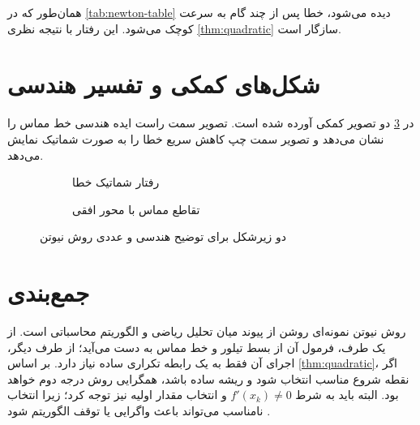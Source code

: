 همان‌طور که در \cref{tab:newton-table} دیده می‌شود، خطا پس از چند گام به سرعت کوچک می‌شود. این رفتار با نتیجه نظری \cref{thm:quadratic} سازگار است.

\section{شکل‌های کمکی و تفسیر هندسی}
در \cref{fig:subfigures} دو تصویر کمکی آورده شده است. تصویر سمت راست ایده هندسی خط مماس را نشان می‌دهد و تصویر سمت چپ کاهش سریع خطا را به صورت شماتیک نمایش می‌دهد.

\begin{figure}[H]
\centering
\begin{subfigure}{0.46\textwidth}
\centering
{}
\caption{رفتار شماتیک خطا}
\label{fig:error-sub}
\end{subfigure}
\hfill
\begin{subfigure}{0.46\textwidth}
\centering
{}
\caption{تقاطع مماس با محور افقی}
\label{fig:tangent-sub}
\end{subfigure}
\caption{دو زیرشکل برای توضیح هندسی و عددی روش نیوتن}
\label{fig:subfigures}
\end{figure}

\section{جمع‌بندی}
روش نیوتن نمونه‌ای روشن از پیوند میان تحلیل ریاضی و الگوریتم محاسباتی است. از یک طرف، فرمول آن از بسط تیلور و خط مماس به دست می‌آید؛ از طرف دیگر، اجرای آن فقط به یک رابطه تکراری ساده نیاز دارد. بر اساس \cref{thm:quadratic}، اگر نقطه شروع مناسب انتخاب شود و ریشه ساده باشد، همگرایی روش درجه دوم خواهد بود. البته باید به شرط $f'(x_k)\neq 0$ و انتخاب مقدار اولیه نیز توجه کرد؛ زیرا انتخاب نامناسب می‌تواند باعث واگرایی یا توقف الگوریتم شود \cite{nocedal,rudin}.
